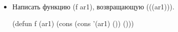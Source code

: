 \begin{itemize}
	\begin{figure}[H]
	\end{figure} 
	
	\item Написать функцию (f ar1), возвращающую (((ar1))).
	
	(defun f (ar1) (cons (cons '(ar1) ()) ()))
	

\end{itemize}
